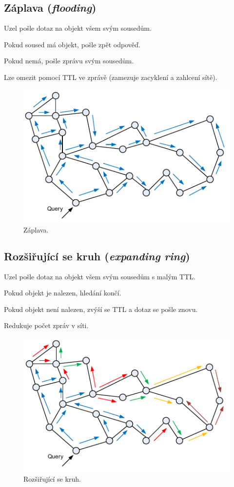 \subsection{Záplava (\textit{flooding})} \begin{compactitem}
    \item Uzel pošle dotaz na objekt všem svým sousedům. \begin{compactitem}
        \item Pokud soused má objekt, pošle zpět odpověď.
        \item Pokud nemá, pošle zprávu svým sousedům.
    \end{compactitem}
    \item Lze omezit pomocí TTL ve zprávě (zamezuje zacyklení a zahlcení sítě).
\end{compactitem}

\begin{figure}[H]
    \centering
    \includegraphics[width=0.6\linewidth]{flooding.pdf}
    \caption{Záplava.}
\end{figure}

\subsection{Rozšiřující se kruh (\textit{expanding ring})} \begin{compactitem}
    \item Uzel pošle dotaz na objekt všem svým sousedům s malým TTL. \begin{compactitem}
        \item Pokud objekt je nalezen, hledání končí.
        \item Pokud objekt není nalezen, zvýší se TTL a dotaz se pošle znovu.
    \end{compactitem}
    \item Redukuje počet zpráv v síti.
\end{compactitem}

\begin{figure}[H]
    \centering
    \includegraphics[width=0.6\linewidth]{expanding_ring.pdf}
    \caption{Rozšiřující se kruh.}
\end{figure}

